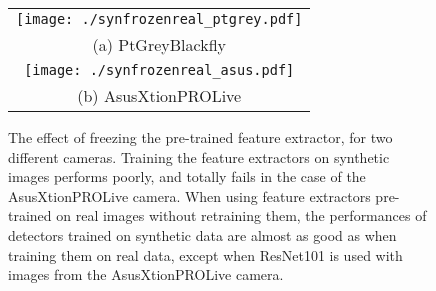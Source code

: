 \documentclass[10pt,twocolumn,letterpaper]{article}
\newcommand{\vincentrmk}[1]{{\color{ForestGreen}\bf #1}}
\newcommand{\stefanrmk}[1]{{\color{DarkRed}\bf #1}}
\newcommand{\comment}[1]{}
\newcommand{\asus}[0]{AsusXtionPROLive\xspace}
\newcommand{\ptgrey}[0]{PtGreyBlackfly\xspace}
\begin{document}







\begin{figure}
\begin{center}
\begin{tabular}{c}
\texttt{[image: ./synfrozenreal\_ptgrey.pdf]} \\
(a) \ptgrey \\
\texttt{[image: ./synfrozenreal\_asus.pdf]} \\
(b) \asus \\
\end{tabular}
\end{center}
\caption{\label{fig:freezing}  The effect  of freezing  the pre-trained  feature
  extractor,  for two  different cameras.   Training the  feature extractors  on
  synthetic images  performs poorly, and totally  fails in the case  of the \asus
  camera.  When  using  feature  extractors   pre-trained  on  real  images  without
  retraining them, the performances of detectors trained on synthetic data are almost  as good as when training them on real
  data, except when ResNet101 is used with images from the \asus camera.}
\end{figure}
\end{document}
